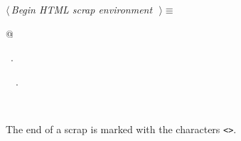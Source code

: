 \documentclass{report}
\begin{document}
\begin{flushleft} \small
\begin{minipage}{\linewidth} \label{scrap104}
$\langle\,${\it Begin HTML scrap environment}\nobreak\ {\footnotesize {}}$\,\rangle\equiv$
\vspace{-1ex}
\begin{list}{}{} \item
\mbox{}@{\NWsep}
\end{list}
\vspace{-1ex}
\footnotesize\addtolength{\baselineskip}{-1ex}
\begin{list}{}{\setlength{\itemsep}{-\parsep}\setlength{\itemindent}{-\leftmargin}}
\item \NWtxtMacroRefIn\ .
\end{list}
\vspace{-2ex}
\footnotesize\addtolength{\baselineskip}{-1ex}
\begin{list}{}{\setlength{\itemsep}{-\parsep}\setlength{\itemindent}{-\leftmargin}}
\item \NWtxtIdentsUsed\nobreak\  \verb@fputs@\nobreak\ .\end{list}
\end{minipage}\\[4ex]
\end{flushleft}
The end of a scrap is marked with the characters \verb|<>|.
\end{document}
